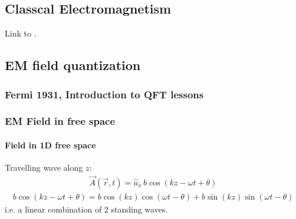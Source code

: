 \documentclass[letterpaper,10pt,english]{jupyterBook}
\begin{document}
\subsection{Classcal Electromagnetism}
\label{\detokenize{ch/quantum-mechanics/qft/photons:classcal-electromagnetism}}\label{\detokenize{ch/quantum-mechanics/qft/photons:quantum-mechanics-qft-photons-classical-em}}
\sphinxAtStartPar
Link to .


\subsection{EM field quantization}
\label{\detokenize{ch/quantum-mechanics/qft/photons:em-field-quantization}}\label{\detokenize{ch/quantum-mechanics/qft/photons:quantum-mechanics-qft-photons-em-field-quantization}}

\subsubsection{Fermi 1931, Introduction to QFT lessons}
\label{\detokenize{ch/quantum-mechanics/qft/photons:fermi-1931-introduction-to-qft-lessons}}\label{\detokenize{ch/quantum-mechanics/qft/photons:quantum-mechanics-qft-photons-em-field-quantization-fermi}}

\subsubsection{EM Field in free space}
\label{\detokenize{ch/quantum-mechanics/qft/photons:em-field-in-free-space}}\label{\detokenize{ch/quantum-mechanics/qft/photons:quantum-mechanics-qft-photons-em-field-quantization-free-space}}

\paragraph{Field in 1D free space}
\label{\detokenize{ch/quantum-mechanics/qft/photons:field-in-1d-free-space}}
\sphinxAtStartPar
Travelling wave along \(z\):
\begin{equation*}
\begin{split}
\vec A(\vec r,t)=\hat u_x\,b\cos(kz-\omega t+\theta)
\end{split}
\end{equation*}\begin{equation*}
\begin{split}
b\cos(kz-\omega t+\theta)=b\cos(kz)\cos(\omega t-\theta)+b\sin(kz)\sin(\omega t-\theta)
\end{split}
\end{equation*}
\sphinxAtStartPar
i.e. a linear combination of 2 standing waves.
\end{document}
